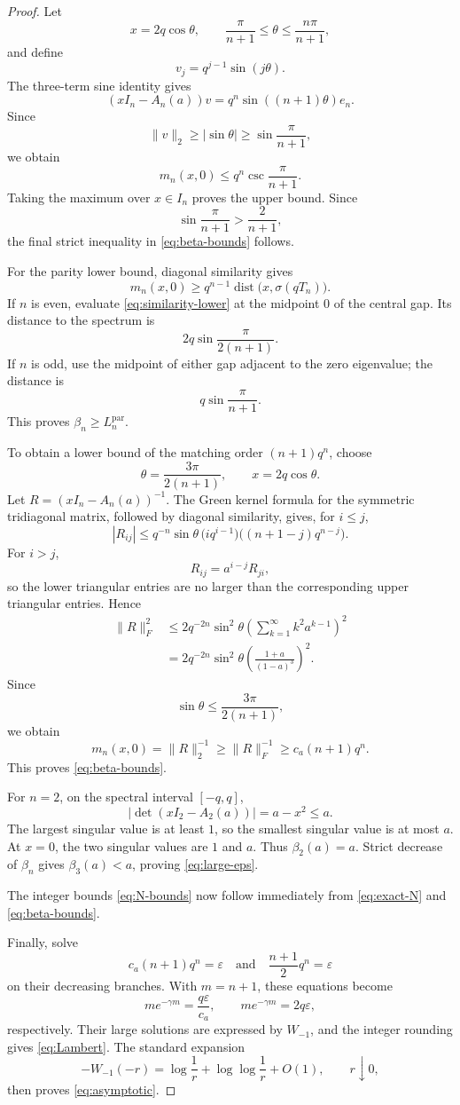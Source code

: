 \documentclass[11pt]{article}
\begin{document}
\begin{proof}
Let
\[
x=2q\cos\theta,
\qquad
\frac{\pi}{n+1}\leq\theta\leq
\frac{n\pi}{n+1},
\]
and define
\[
v_j=q^{j-1}\sin(j\theta).
\]
The three-term sine identity gives
\[
(xI_n-A_n(a))v
=
q^n\sin((n+1)\theta)e_n.
\]
Since
\[
\|v\|_2\geq|\sin\theta|
\geq\sin\frac{\pi}{n+1},
\]
we obtain
\[
m_n(x,0)
\leq
q^n\csc\frac{\pi}{n+1}.
\]
Taking the maximum over \(x\in I_n\) proves the upper bound.  Since
\[
\sin\frac{\pi}{n+1}>\frac{2}{n+1},
\]
the final strict inequality in \eqref{eq:beta-bounds} follows.

For the parity lower bound, diagonal similarity gives
\[
m_n(x,0)
\geq
q^{n-1}\operatorname{dist}\bigl(x,\sigma(qT_n)\bigr).
\tag{24}\label{eq:similarity-lower}
\]
If \(n\) is even, evaluate \eqref{eq:similarity-lower} at the midpoint \(0\)
of the central gap.  Its distance to the spectrum is
\[
2q\sin\frac{\pi}{2(n+1)}.
\]
If \(n\) is odd, use the midpoint of either gap adjacent to the zero
eigenvalue; the distance is
\[
q\sin\frac{\pi}{n+1}.
\]
This proves \(\beta_n\geq L_n^{\mathrm{par}}\).

To obtain a lower bound of the matching order \((n+1)q^n\), choose
\[
\theta=\frac{3\pi}{2(n+1)},
\qquad
x=2q\cos\theta.
\]
Let \(R=(xI_n-A_n(a))^{-1}\).  The Green kernel formula for the symmetric
tridiagonal matrix, followed by diagonal similarity, gives, for \(i\leq j\),
\[
|R_{ij}|
\leq
q^{-n}\sin\theta\,
\bigl(iq^{i-1}\bigr)
\bigl((n+1-j)q^{n-j}\bigr).
\]
For \(i>j\),
\[
R_{ij}=a^{i-j}R_{ji},
\]
so the lower triangular entries are no larger than the corresponding upper
triangular entries.  Hence
\[
\begin{aligned}
\|R\|_F^2
&\leq
2q^{-2n}\sin^2\theta
\left(
\sum_{k=1}^{\infty}k^2a^{k-1}
\right)^2\\
&=
2q^{-2n}\sin^2\theta
\left(\frac{1+a}{(1-a)^3}\right)^2.
\end{aligned}
\]
Since
\[
\sin\theta\leq\frac{3\pi}{2(n+1)},
\]
we obtain
\[
m_n(x,0)
=
\|R\|_2^{-1}
\geq
\|R\|_F^{-1}
\geq
c_a(n+1)q^n.
\]
This proves \eqref{eq:beta-bounds}.

For \(n=2\), on the spectral interval \([-q,q]\),
\[
|\det(xI_2-A_2(a))|=a-x^2\leq a.
\]
The largest singular value is at least \(1\), so the smallest singular value
is at most \(a\).  At \(x=0\), the two singular values are \(1\) and \(a\).
Thus \(\beta_2(a)=a\).  Strict decrease of \(\beta_n\) gives
\(\beta_3(a)<a\), proving \eqref{eq:large-eps}.

The integer bounds \eqref{eq:N-bounds} now follow immediately from
\eqref{eq:exact-N} and \eqref{eq:beta-bounds}.

Finally, solve
\[
c_a(n+1)q^n=\varepsilon
\quad\text{and}\quad
\frac{n+1}{2}q^n=\varepsilon
\]
on their decreasing branches.  With \(m=n+1\), these equations become
\[
m e^{-\gamma m}=\frac{q\varepsilon}{c_a},
\qquad
m e^{-\gamma m}=2q\varepsilon,
\]
respectively.  Their large solutions are expressed by \(W_{-1}\), and the
integer rounding gives \eqref{eq:Lambert}.  The standard expansion
\[
-W_{-1}(-r)
=
\log\frac1r+\log\log\frac1r+O(1),
\qquad r\downarrow0,
\]
then proves \eqref{eq:asymptotic}.
\end{proof}
\end{document}
